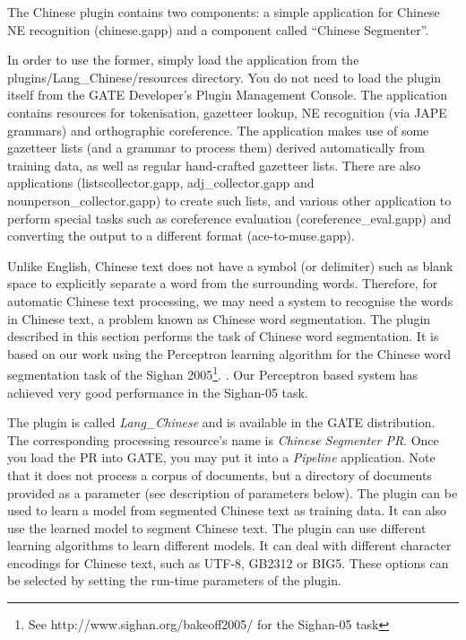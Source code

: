 
The Chinese plugin contains two components: a simple application for Chinese 
NE recognition (chinese.gapp) and a component called ``Chinese Segmenter''.

In order to use the former, simply load the application from the\linebreak 
plugins/Lang\_Chinese/resources directory. You do not need to load the plugin 
itself from the GATE Developer's Plugin
Management Console. The application contains resources 
for tokenisation, gazetteer lookup, NE recognition (via JAPE grammars) and 
orthographic coreference. The application makes use of some gazetteer lists (and
a grammar to process them) derived automatically from training data, as well as 
regular hand-crafted gazetteer lists. There are also applications
(listscollector.gapp, adj\_collector.gapp and
nounperson\_collector.gapp) to create such lists, and various other
application to perform special tasks such as coreference evaluation
(coreference\_eval.gapp) and converting the output to a different
format (ace-to-muse.gapp).



Unlike English, Chinese text does not have a symbol (or delimiter)
 such as blank space to explicitly separate a word from the
 surrounding words.  Therefore, for automatic Chinese text processing,
 we may need a system to recognise the words in Chinese text, a
 problem known as Chinese word segmentation. The plugin described in
 this section performs the task of Chinese word segmentation. It is
 based on our work using the Perceptron learning algorithm for the Chinese
 word segmentation task of the Sighan 2005\footnote{See
 http://www.sighan.org/bakeoff2005/ for the Sighan-05 task}.
\cite{Yaoyong05b}. Our Perceptron based system has achieved very good
performance in the Sighan-05 task.

The plugin is called {\em Lang\_Chinese} and is available in the GATE
distribution. The corresponding processing resource's name is {\em Chinese
  Segmenter PR}. Once you load the PR into GATE, you may put it into a {\em
  Pipeline} application. Note that it does not process a corpus of documents,
but a directory of documents provided as a parameter (see description of
parameters below). The plugin can be used to learn a model from segmented
Chinese text as training data. It can also use the learned model to segment
Chinese text.  The plugin can use different learning algorithms to learn
different models.  It can deal with different character encodings for
Chinese text, such as UTF-8, GB2312 or BIG5.  These options can
be selected by setting the run-time parameters of the plugin.

